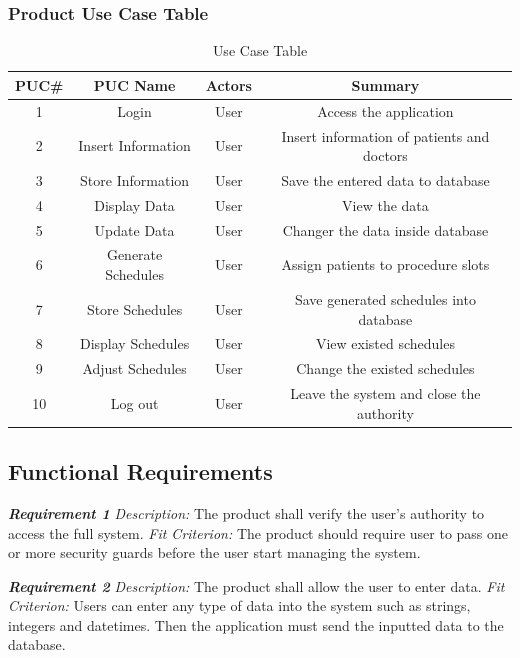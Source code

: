 \documentclass[12pt, titlepage]{article}
\begin{document}
\subsubsection{Product Use Case Table}
\begin{center}
\begin{table}[H]
  \centering
\begin{tabular}{ |c|c|c|c| }
\hline
PUC\# & PUC Name & Actors & Summary \\
\hline
1 & Login & User & Access the application \\
2 & Insert Information & User & Insert information of patients and doctors \\
3 & Store Information & User & Save the entered data to database \\
4 & Display Data & User & View the data \\
5 & Update Data & User & Changer the data inside database \\
6 & Generate Schedules & User & Assign patients to procedure slots \\
7 & Store Schedules & User & Save generated schedules into database \\
8 & Display Schedules & User & View existed schedules \\
9 & Adjust Schedules & User & Change the existed schedules \\
10 & Log out & User & Leave the system and close the authority  \\
\hline
\end{tabular}
\caption{Use Case Table}
\end{table}
\end{center}

\subsection{Functional Requirements}
\textbf{\textit{Requirement 1}}\newline
\textit{Description:}\newline
The product shall verify the user’s authority to access the full system.\newline\newline
\textit{Fit Criterion:}\newline 
The product should require user to pass one or more security guards before the user start managing the system. 
\newline

\noindent\textbf{\textit{Requirement 2}}\newline
\textit{Description:}\newline
The product shall allow the user to enter data.\newline\newline
\textit{Fit Criterion:}\newline 
Users can enter any type of data into the system such as strings, integers and datetimes. Then the application must send the inputted data to the database.
\newline
\end{document}
